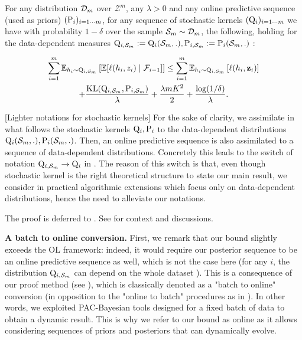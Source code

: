 \begin{theorem}
  \label{th: main_thm_online}
  For any distribution $\Dm$ over $\mathcal{Z}^m$, any $\lambda>0$ and any online predictive sequence (used as priors) $(\P_{i})_{i=1\cdots m}$, for any sequence of stochastic kernels $(\Q_{i})_{i=1\cdots m}$ we have with probability $1-\delta$ over the sample $\Sm\sim\Dm$, the following, holding for the data-dependent measures $\Q_{i,\Sm}:= \Q_{i}(\Sm,.), \P_{i,\Sm}:= \P_{i}(\Sm,.)$ :

  \begin{multline*} 
    \sum_{i=1}^m \mathbb{E}_{h_i\sim \Q_{i,\Sm}}\left[ \mathbb{E}[\ell(h_i,z_i) \mid \mathcal{F}_{i-1}]    \right]  \leq \sum_{i=1}^m \mathbb{E}_{h_i\sim \Q_{i,\Sm}}\left[ \ell(h_i,\z_i) \right] \\
    + \frac{\operatorname{KL}(\Q_{i,\Sm}, \P_{i,\Sm})}{\lambda} + \frac{\lambda m K^2}{2} + \frac{\log(1/\delta)}{\lambda}. \end{multline*}

\end{theorem}

\begin{remark}
  \label{rem: notations}[Lighter notations for stochastic kernels]
  For the sake of clarity, we assimilate in what follows the stochastic kernels $\Q_{i},\P_{i}$ to the data-dependent distributions $\Q_{i}(\Sm,.), \P_{i}(\Sm,.)$. Then, an online predictive sequence is also assimilated to a sequence of data-dependent distributions. Concretely this leads to the switch of notation $\Q_{i,\Sm}\rightarrow \Q_{i}$ in . The reason of this switch is that, even though stochastic kernel is the right theoretical structure to state our main result, we consider in  practical algorithmic extensions which focus only on data-dependent distributions, hence the need to alleviate our notations.
\end{remark}

The proof is deferred to . See  for context and discussions.

\textbf{A batch to online conversion.}
   First, we remark that our bound slightly exceeds the OL framework: indeed, it would require our posterior sequence to be an online predictive sequence as well, which is not the case here (for any $i$, the distribution $\Q_{i,\Sm}$ can depend on the whole dataset ). This is a consequence of our proof method (see ), which is classically denoted as a "batch to online" conversion (in opposition to the "online to batch" procedures as in \citealp{dekel2005data}). In other words, we exploited PAC-Bayesian tools designed for a fixed batch of data to obtain a dynamic result. This is why we refer to our bound as online as it allows considering sequences of priors and posteriors that can dynamically evolve.



